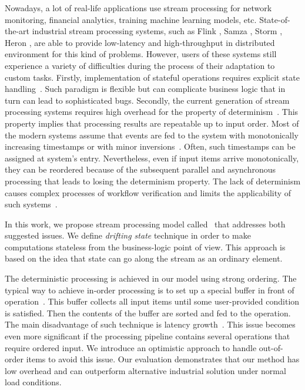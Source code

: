 
\label {fs-intro-seciton}

Nowadays, a lot of real-life applications use stream processing for network monitoring, financial analytics, training machine learning models, etc. State-of-the-art industrial stream processing systems, such as Flink \cite{carbone2015apache}, Samza \cite{Noghabi:2017:SSS:3137765.3137770}, Storm \cite{apache:storm}, Heron \cite{Kulkarni:2015:THS:2723372.2742788}, are able to provide low-latency and high-throughput in distributed environment for this kind of problems. However, users of these systems still experience a variety of difficulties during the process of their adaptation to custom tasks. Firstly, implementation of stateful operations requires explicit state handling~\cite{apache:flink:state, apache:storm:state}. Such paradigm is flexible but can complicate business logic that in turn can lead to sophisticated bugs. Secondly, the current generation of stream processing systems requires high overhead for the property of determinism~\cite{Zacheilas:2017:MDS:3093742.3093921}. This property implies that processing results are repeatable up to input order. Most of the modern systems assume that events are fed to the system with monotonically increasing timestamps or with minor inversions~\cite{Wei:2009:SSO:1559845.1559973}. Often, such timestamps can be assigned at system's entry. Nevertheless, even if input items arrive monotonically, they can be reordered because of the subsequent parallel and asynchronous processing that leads to losing the determinism property. The lack of determinism causes complex processes of workflow verification and limits the applicability of such systems~\cite{Zacheilas:2017:MDS:3093742.3093921}.

In this work, we propose stream processing model called \FlameStream\ that addresses both suggested issues. We define {\it drifting state} technique in order to make computations stateless from the business-logic point of view. This approach is based on the idea that state can go along the stream as an ordinary element. 

The deterministic processing is achieved in our model using strong ordering. The typical way to achieve in-order processing is to set up a special buffer in front of operation~\cite{Li:2008:OPN:1453856.1453890}. This buffer collects all input items until some user-provided condition is satisfied. Then the contents of the buffer are sorted and fed to the operation. The main disadvantage of such technique is latency growth~\cite{Zacheilas:2017:MDS:3093742.3093921}. This issue becomes even more significant if the processing pipeline contains several operations that require ordered input. We introduce an optimistic approach to handle out-of-order items to avoid this issue. Our evaluation demonstrates that our method has low overhead and can outperform alternative industrial solution under normal load conditions.

